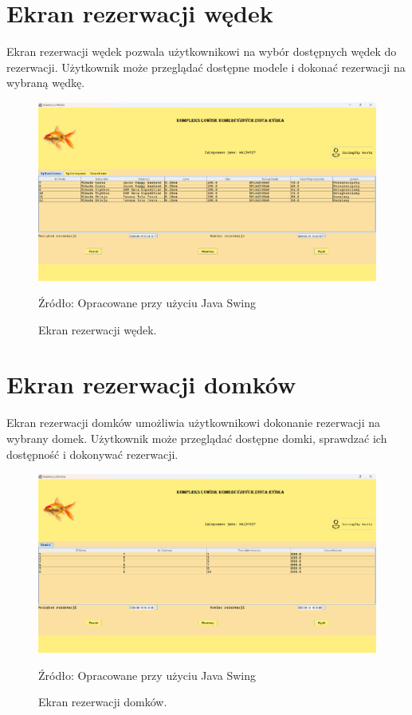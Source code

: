 \section{Ekran rezerwacji wędek}
Ekran rezerwacji wędek pozwala użytkownikowi na wybór dostępnych wędek do rezerwacji. Użytkownik może przeglądać dostępne modele i dokonać rezerwacji na wybraną wędkę.
\begin{figure}[H]
    \centering
    \includegraphics[width=0.8\linewidth]{figures/rods.eps}
    \caption{Ekran rezerwacji wędek.}
    \label{fig:rods_screen}
    \small{Źródło: Opracowane przy użyciu Java Swing}
\end{figure}
\clearpage

\section{Ekran rezerwacji domków}
Ekran rezerwacji domków umożliwia użytkownikowi dokonanie rezerwacji na wybrany domek. Użytkownik może przeglądać dostępne domki, sprawdzać ich dostępność i dokonywać rezerwacji.
\begin{figure}[H]
    \centering
    \includegraphics[width=0.8\linewidth]{figures/houses.eps}
    \caption{Ekran rezerwacji domków.}
    \label{fig:houses_screen}
    \small{Źródło: Opracowane przy użyciu Java Swing}
\end{figure}
\clearpage

